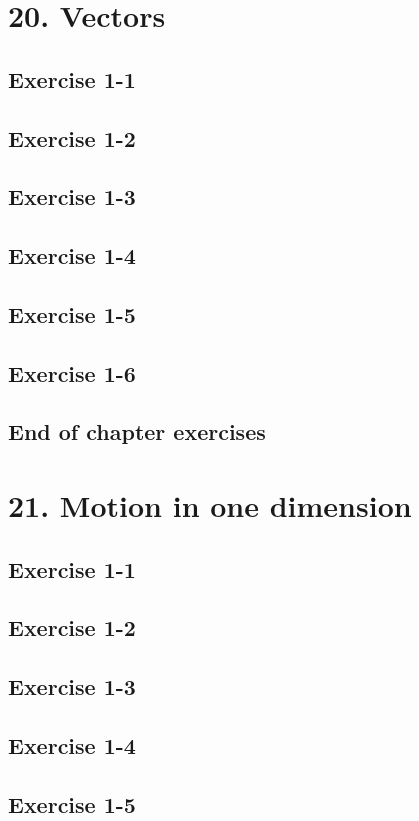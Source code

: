 \section{20. Vectors}
\subsection{Exercise 1-1}
\subsection{Exercise 1-2}
\subsection{Exercise 1-3}
\subsection{Exercise 1-4}
\subsection{Exercise 1-5}
\subsection{Exercise 1-6}
\subsection{End of chapter exercises}
\section{21. Motion in one dimension}
\subsection{Exercise 1-1}
\subsection{Exercise 1-2}
\subsection{Exercise 1-3}
\subsection{Exercise 1-4}
\subsection{Exercise 1-5}
